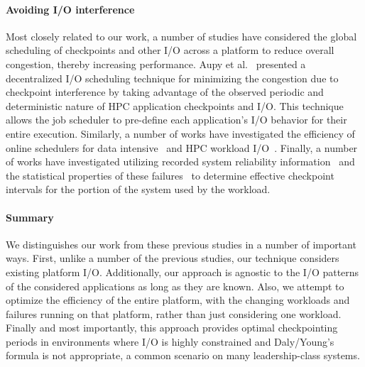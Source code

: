 \paragraph*{Avoiding I/O interference}

Most closely related to our work, a number of studies have considered the global
scheduling of checkpoints and other I/O across a platform to reduce overall
congestion, thereby increasing performance.  Aupy et al.~\cite{Aupy:2017:Periodic}
presented a decentralized I/O scheduling technique for minimizing the congestion due
to checkpoint interference by taking advantage of the observed periodic and
deterministic nature of HPC application checkpoints and I/O.  This technique allows
the job scheduler to pre-define each application’s I/O behavior for their entire
execution.  Similarly, a number of works have investigated the efficiency of online
schedulers for data intensive~\cite{Groot2013,Sim:2015:AnalyzeThis} and HPC workload
I/O~\cite{Dorier2015,Gainaru:2016:Scheduling,Zhou:2015:IOAware,Herbein2017}.
Finally, a number of works have investigated utilizing recorded system reliability
information~\cite{Oliner:2006:Cooperative} and the statistical properties of these
failures~\cite{Tiwari:2014:Lazy} to determine effective checkpoint intervals for the
portion of the system used by the workload.

\paragraph*{Summary}

We distinguishes our work from these previous studies in a number of important ways.
First, unlike a number of the previous studies, our technique considers existing
platform I/O.   Additionally, our approach is agnostic to the I/O patterns of
the considered applications as long as they are known.  Also, we attempt to optimize
the efficiency of the entire platform, with the changing workloads and failures
running on that platform, rather than just considering one workload. Finally and most
importantly, this approach provides optimal checkpointing periods in environments
where I/O is highly constrained and Daly/Young's formula is not appropriate, a common
scenario on many leadership-class systems.

